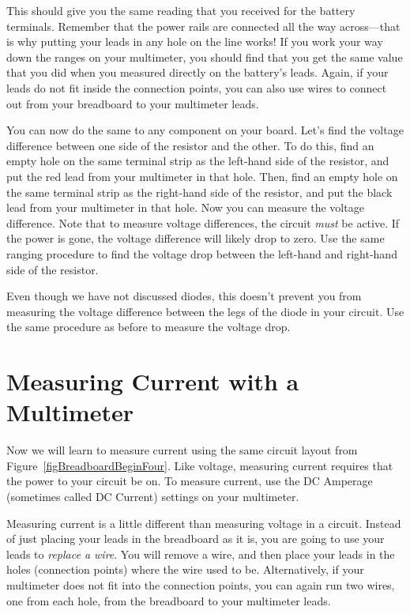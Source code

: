 This should give you the same reading that you received for the battery terminals.
Remember that the power rails are connected all the way across---that is why putting your leads in any hole on the line works!
If you work your way down the ranges on your multimeter, you should find that you get the same value that you did when you measured directly on the battery's leads.
Again, if your leads do not fit inside the connection points, you can also use wires to connect out from your breadboard to your multimeter leads.

You can now do the same to any component on your board.
Let's find the voltage difference between one side of the resistor and the other.
To do this, find an empty hole on the same terminal strip as the left-hand side of the resistor, and put the red lead from your multimeter in that hole.
Then, find an empty hole on the same terminal strip as the right-hand side of the resistor, and put the black lead from your multimeter in that hole.
Now you can measure the voltage difference.
Note that to measure voltage differences, the circuit \emph{must} be active.
If the power is gone, the voltage difference will likely drop to zero.
Use the same ranging procedure to find the voltage drop between the left-hand and right-hand side of the resistor.

Even though we have not discussed diodes, this doesn't prevent you from measuring the voltage difference between the legs of the diode in your circuit.
Use the same procedure as before to measure the voltage drop.

\section{Measuring Current with a Multimeter}

Now we will learn to measure current using the same circuit layout from Figure~\ref{figBreadboardBeginFour}.
Like voltage, measuring current requires that the power to your circuit be on.
To measure current, use the DC Amperage (sometimes called DC Current) settings on your multimeter.

Measuring current is a little different than measuring voltage in a circuit.
Instead of just placing your leads in the breadboard as it is, you are going to use your leads to \emph{replace a wire}.
You will remove a wire, and then place your leads in the holes (connection points) where the wire used to be.
Alternatively, if your multimeter does not fit into the connection points, you can again run two wires, one from each hole, from the breadboard to your multimeter leads.

